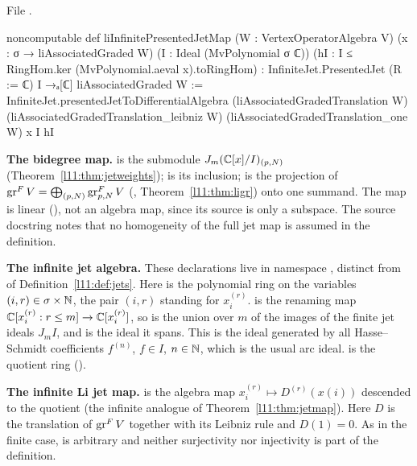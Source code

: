 \noindent File .
\begin{leancode}
noncomputable def liInfinitePresentedJetMap (W : VertexOperatorAlgebra V)
    (x : σ → liAssociatedGraded W) (I : Ideal (MvPolynomial σ ℂ))
    (hI : I ≤ RingHom.ker (MvPolynomial.aeval x).toRingHom) :
    InfiniteJet.PresentedJet (R := ℂ) I →ₐ[ℂ] liAssociatedGraded W :=
  InfiniteJet.presentedJetToDifferentialAlgebra (liAssociatedGradedTranslation W)
    (liAssociatedGradedTranslation_leibniz W) (liAssociatedGradedTranslation_one W) x I hI
\end{leancode}

\begin{dictionary}
\textbf{The bidegree map.}  is the submodule
$J_m({\mathbb{C}}[x]/I)_{(p,N)}$ (Theorem~\ref{l11:thm:jetweights});  is its inclusion;
 is the projection of $\operatorname{gr}^FV = \bigoplus_{(p,N)}\operatorname{gr}^F_{p,N}V$
(, Theorem~\ref{l11:thm:ligr}) onto one summand. The map is linear (), not an algebra map,
since its source is only a subspace. The source docstring notes that no homogeneity of the full jet map is assumed in
the definition.

\textbf{The infinite jet algebra.} These declarations live in namespace , distinct from
 of Definition~\ref{l11:def:jets}. Here  is the polynomial ring on the variables
$(i,r)\in\sigma\times{\mathbb{N}}$, the pair $(i,r)$ standing for $x_i^{(r)}$.  is the renaming map
${\mathbb{C}}[x_i^{(r)}:r\le m]\to{\mathbb{C}}[x_i^{(r)}]$, so  is the union over $m$ of the images of the finite jet ideals
$J_mI$, and  is the ideal it spans. This is the ideal generated by all Hasse--Schmidt coefficients
$f^{(n)}$, $f\in I$, $n\in{\mathbb{N}}$, which is the usual arc ideal.  is the quotient ring ().

\textbf{The infinite Li jet map.}  is the algebra map
$x_i^{(r)}\mapsto D^{(r)}(x(i))$ descended to the quotient (the infinite analogue of Theorem~\ref{l11:thm:jetmap}). Here
$D$ is the translation of $\operatorname{gr}^FV$ together with its Leibniz rule and $D(1)=0$. As in the finite case,  is
arbitrary and neither surjectivity nor injectivity is part of the definition.
\end{dictionary}

